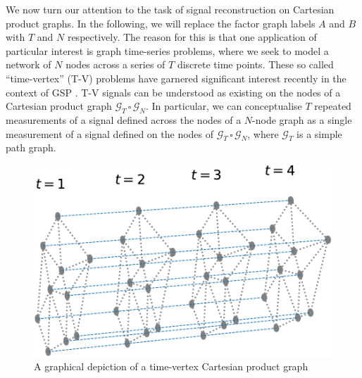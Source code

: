 \label{sec:gsr_cpg}

We now turn our attention to the task of signal reconstruction on Cartesian product graphs. In the following, we will replace the factor graph labels $A$ and $B$ with $T$ and $N$ respectively. The reason for this is that one application of particular interest is graph time-series problems, where we seek to model a network of $N$ nodes across a series of $T$ discrete time points. These so called ``time-vertex'' (T-V) problems have garnered significant interest recently in the context of GSP \citep{Grassi2018, Isufi2017, Loukas2016}. T-V signals can be understood as existing on the nodes of a Cartesian product graph $\mathcal{G}_T \, \square \, \mathcal{G}_N$. In particular, we can conceptualise $T$ repeated measurements of a signal defined across the nodes of a $N$-node graph as a single measurement of a signal defined on the nodes of $\mathcal{G}_T \, \square \, \mathcal{G}_N$, where $\mathcal{G}_T$ is a simple path graph.

\vspace{1cm}


\begin{figure}[b]
    \begin{center}
    \includegraphics[width=0.5\linewidth]{Figures/T-V.pdf}
    \end{center}
    \caption[A time-vertex Cartesian product graph]{A graphical depiction of a time-vertex Cartesian product graph}
    \label{fig:TV}
\end{figure}



